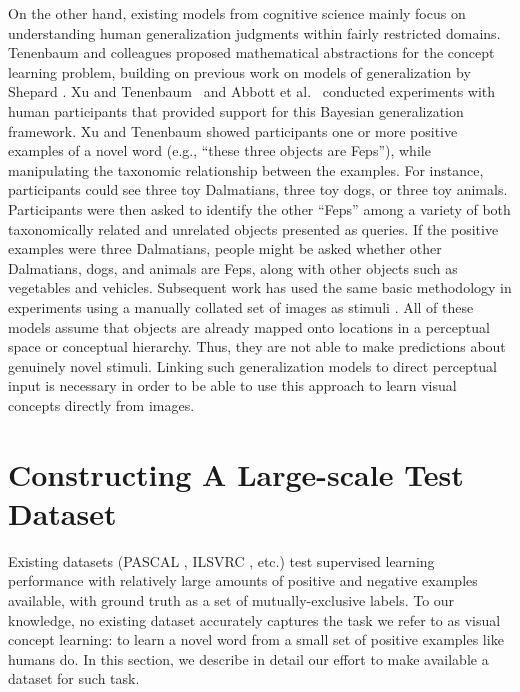 On the other hand, existing models from cognitive science mainly focus on understanding
human generalization judgments within fairly restricted domains. Tenenbaum
and colleagues \cite{tenenbaum99,tenenbaum2001generalization} proposed
mathematical abstractions for the concept learning problem, building on
previous work on models of generalization by Shepard \cite{shepard87}. Xu
and Tenenbaum~\cite{xu2007word} and Abbott et al.~\cite{abbottconstructing} conducted
experiments with human participants that provided support for this
Bayesian generalization framework. Xu and Tenenbaum \cite{xu2007word} showed participants one or more positive examples of a novel word (e.g., ``these three objects are Feps''), while manipulating the taxonomic relationship between the examples. For instance, participants could see three toy Dalmatians, three toy dogs, or three toy animals. Participants were then asked to identify the other ``Feps'' among a variety of both taxonomically related and unrelated objects presented as queries. If the positive examples were three Dalmatians, people might be asked whether other Dalmatians, dogs, and animals are Feps, along with other objects such as vegetables and vehicles. Subsequent work has used the same basic methodology in experiments using a manually collated set of images as stimuli \cite{abbottconstructing}. All of these models assume that objects
are already mapped onto locations in a perceptual space or conceptual
hierarchy. Thus, they are not able to make predictions about genuinely
novel stimuli. Linking such generalization models to direct perceptual
input is necessary in order to be able to use this approach to learn
visual concepts directly from images.




\section{Constructing A Large-scale Test Dataset}\label{sec:mechturk}

Existing datasets (PASCAL \cite{pascal}, ILSVRC \cite{ilsvrc}, etc.) test supervised learning performance with relatively large amounts of positive and negative examples available, with ground truth as a set of mutually-exclusive labels. To our knowledge, no existing dataset accurately captures the task we refer to as visual concept learning: to learn a novel word from a small set of positive examples like humans do. In this section, we describe in detail our effort to make available a dataset for such task.

